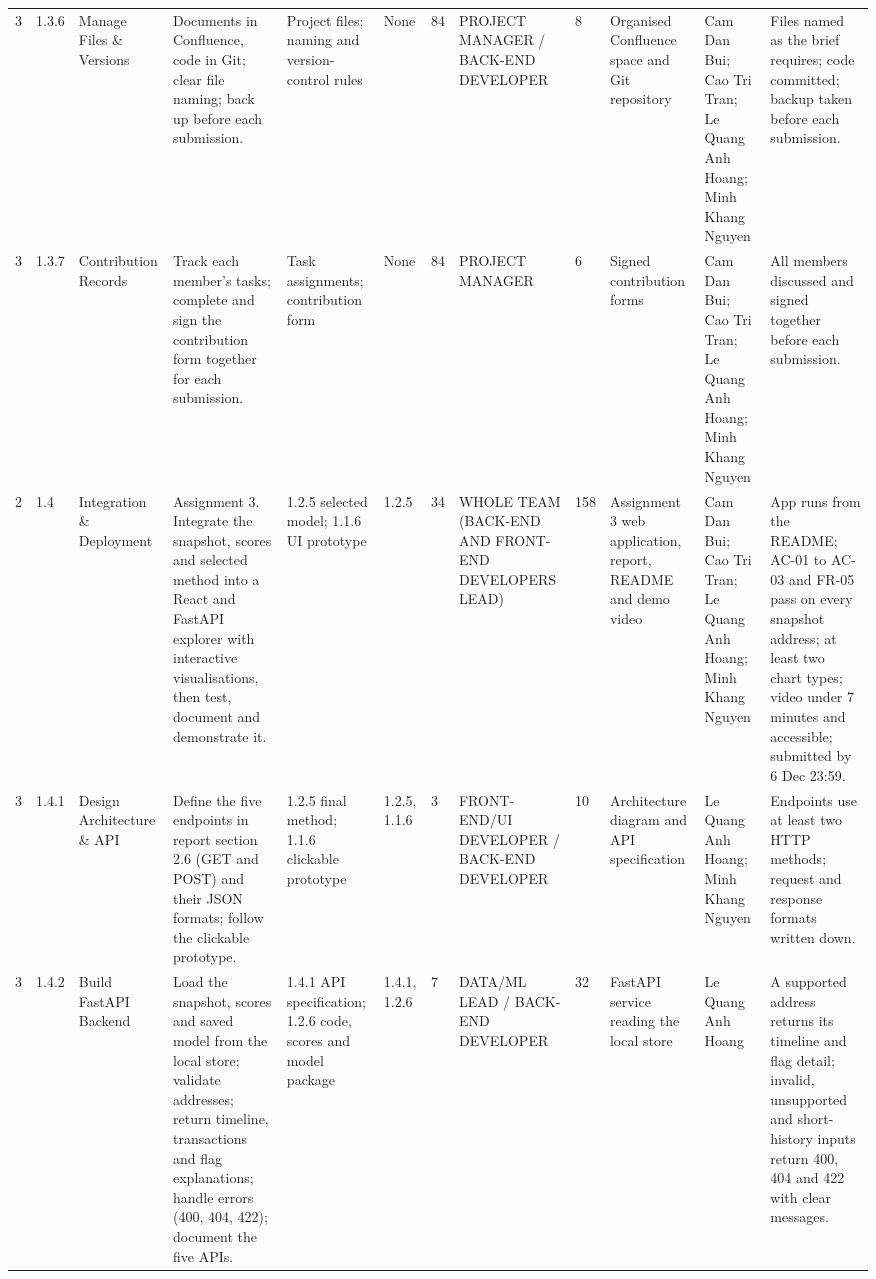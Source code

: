 \begin{landscape}
{\begin{xltabular}{\linewidth}{@{}P{0.9cm} P{1.0cm} P{1.9cm} Z P{2.2cm} P{1.6cm} P{1.1cm} P{1.9cm} P{1.2cm} P{2.2cm} P{1.85cm} Z@{}}
3 & 1.3.6 & Manage Files \& Versions & Documents in Confluence, code in Git; clear file naming; back up before each submission. & Project files; naming and version-control rules & None & 84 & PROJECT MANAGER /\allowbreak{} BACK-END DEVELOPER & 8 & Organised Confluence space and Git repository & Cam Dan Bui; Cao Tri Tran; Le Quang Anh Hoang; Minh Khang Nguyen & Files named as the brief requires; code committed; backup taken before each submission. \\
3 & 1.3.7 & Contribution Records & Track each member's tasks; complete and sign the contribution form together for each submission. & Task assignments; contribution form & None & 84 & PROJECT MANAGER & 6 & Signed contribution forms & Cam Dan Bui; Cao Tri Tran; Le Quang Anh Hoang; Minh Khang Nguyen & All members discussed and signed together before each submission. \\
2 & 1.4 & Integration \& Deployment & Assignment 3. Integrate the snapshot, scores and selected method into a React and FastAPI explorer with interactive visualisations, then test, document and demonstrate it. & 1.2.5 selected model; 1.1.6 UI prototype & 1.2.5 & 34 & WHOLE TEAM (BACK-END AND FRONT-END DEVELOPERS LEAD) & 158 & Assignment 3 web application, report, README and demo video & Cam Dan Bui; Cao Tri Tran; Le Quang Anh Hoang; Minh Khang Nguyen & App runs from the README; AC-01 to AC-03 and FR-05 pass on every snapshot address; at least two chart types; video under 7 minutes and accessible; submitted by 6 Dec 23:59. \\
3 & 1.4.1 & Design Architecture \& API & Define the five endpoints in report section 2.6 (GET and POST) and their JSON formats; follow the clickable prototype. & 1.2.5 final method; 1.1.6 clickable prototype & 1.2.5, 1.1.6 & 3 & FRONT-END/\allowbreak{}UI DEVELOPER /\allowbreak{} BACK-END DEVELOPER & 10 & Architecture diagram and API specification & Le Quang Anh Hoang; Minh Khang Nguyen & Endpoints use at least two HTTP methods; request and response formats written down. \\
3 & 1.4.2 & Build FastAPI Backend & Load the snapshot, scores and saved model from the local store; validate addresses; return timeline, transactions and flag explanations; handle errors (400, 404, 422); document the five APIs. & 1.4.1 API specification; 1.2.6 code, scores and model package & 1.4.1, 1.2.6 & 7 & DATA/\allowbreak{}ML LEAD /\allowbreak{} BACK-END DEVELOPER & 32 & FastAPI service reading the local store & Le Quang Anh Hoang & A supported address returns its timeline and flag detail; invalid, unsupported and short-history inputs return 400, 404 and 422 with clear messages. \\

\end{xltabular}}
\end{landscape}
